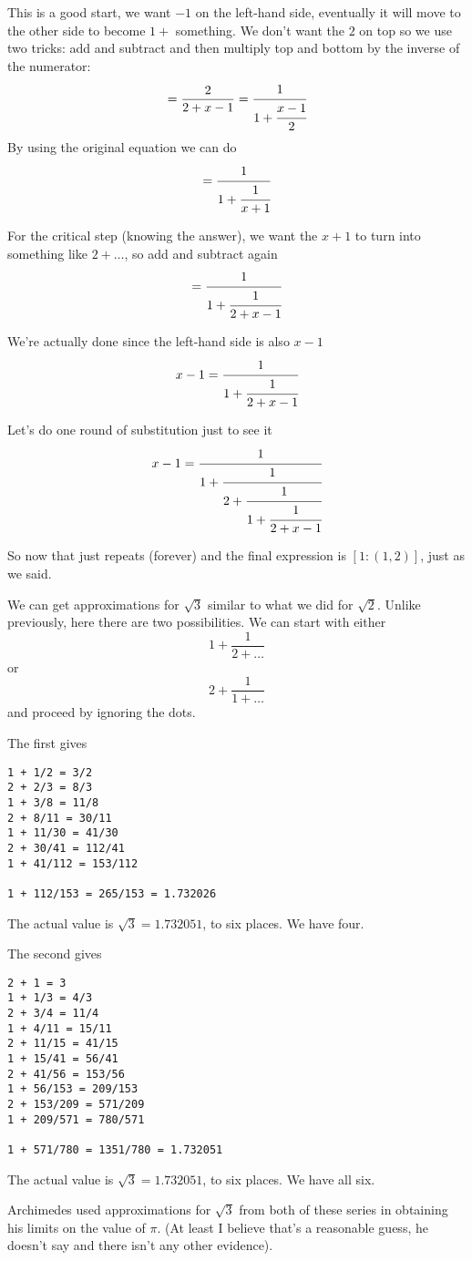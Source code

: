 \documentclass[11pt, oneside]{article}
\begin{document}
This is a good start, we want $-1$ on the left-hand side, eventually it will move to the other side to become $1 + $ something.  We don't want the $2$ on top so we use two tricks:  add and subtract and then multiply top and bottom by the inverse of the numerator:
\[ =  \frac{2}{2 + x - 1} = \cfrac{1}{1 + \cfrac{x-1}{2}} \]
By using the original equation we can do
\[= \cfrac{1}{1 + \cfrac{1}{x+1}} \]

For the critical step (knowing the answer), we want the $x + 1$ to turn into something like $2 + \dots$, so add and subtract again
\[ = \cfrac{1}{1 + \cfrac{1}{2 + x - 1}} \]

We're actually done since the left-hand side is also $x - 1$
\[ x-1 = \cfrac{1}{1 + \cfrac{1}{2 + x - 1}} \]

Let's do one round of substitution just to see it
\[ x - 1 = \cfrac{1}{1 + \cfrac{1}{2 + \cfrac{1}{1 + \cfrac{1}{2 + x - 1}}}} \]

So now that just repeats (forever) and the final expression is $[1:(1,2)]$, just as we said.

We can get approximations for $\sqrt{3}$ similar to what we did for $\sqrt{2}$.  Unlike previously, here there are two possibilities.  We can start with either
\[ 1 + \frac{1}{2 + \dots} \]
or
\[ 2 + \frac{1}{1 + \dots} \]
and proceed by ignoring the dots.

The first gives
\begin{verbatim}
1 + 1/2 = 3/2
2 + 2/3 = 8/3
1 + 3/8 = 11/8
2 + 8/11 = 30/11
1 + 11/30 = 41/30
2 + 30/41 = 112/41
1 + 41/112 = 153/112

1 + 112/153 = 265/153 = 1.732026
\end{verbatim}

The actual value is $\sqrt{3} = 1.732051$, to six places.  We have four.

The second gives
\begin{verbatim}
2 + 1 = 3
1 + 1/3 = 4/3
2 + 3/4 = 11/4
1 + 4/11 = 15/11
2 + 11/15 = 41/15
1 + 15/41 = 56/41
2 + 41/56 = 153/56
1 + 56/153 = 209/153
2 + 153/209 = 571/209
1 + 209/571 = 780/571

1 + 571/780 = 1351/780 = 1.732051
\end{verbatim}

The actual value is $\sqrt{3} = 1.732051$, to six places.  We have all six.

Archimedes used approximations for $\sqrt{3}$ from both of these series in obtaining his limits on the value of $\pi$.  (At least I believe that's a reasonable guess, he doesn't say and there isn't any other evidence).
\end{document}

